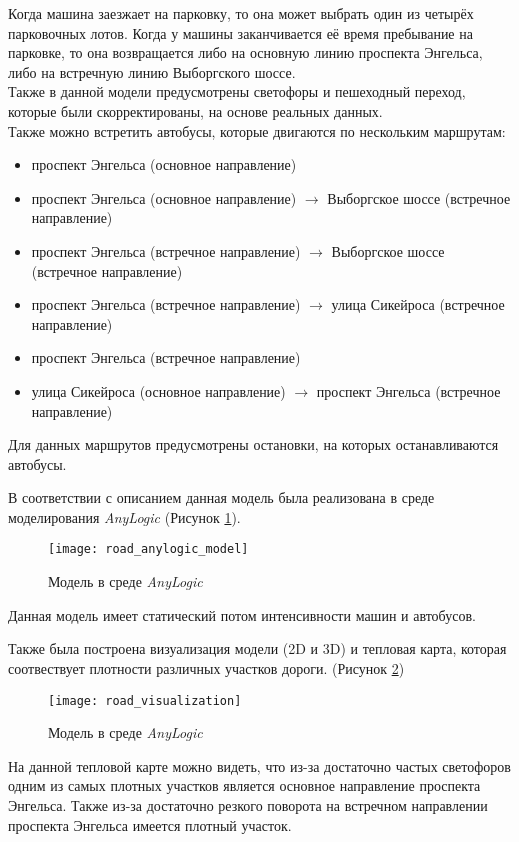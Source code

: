 Когда машина заезжает на парковку, то она может выбрать один из четырёх парковочных лотов. Когда у машины заканчивается её время пребывание на парковке, то она возвращается либо на основную линию проспекта Энгельса, либо на встречную линию Выборгского шоссе.\\

Также в данной модели предусмотрены светофоры и пешеходный переход, которые были скорректированы, на основе реальных данных.\\

Также можно встретить автобусы, которые двигаются по нескольким маршрутам:
\begin{itemize}[topsep=0pt,itemsep=-1ex,partopsep=1ex,parsep=1ex]
	\item проспект Энгельса (основное направление)
	\item проспект Энгельса (основное направление) $\rightarrow$ Выборгское шоссе (встречное направление)
	\item проспект Энгельса (встречное направление) $\rightarrow$ Выборгское шоссе (встречное направление)
	\item проспект Энгельса (встречное направление) $\rightarrow$ улица Сикейроса (встречное направление)
	\item проспект Энгельса (встречное направление)
	\item улица Сикейроса (основное направление) $\rightarrow$ проспект Энгельса (встречное направление)
\end{itemize}

Для данных маршрутов предусмотрены остановки, на которых останавливаются автобусы.

\newpage

В соответствии с описанием данная модель была реализована в среде моделирования \textit{AnyLogic} (Рисунок \ref{fig:road_anylogic_model}).

\begin{figure}[h]
	\centering \texttt{[image: road\_anylogic\_model]}
	\caption{Модель в среде \textit{AnyLogic}}
	\label{fig:road_anylogic_model}
\end{figure}

Данная модель имеет статический потом интенсивности машин и автобусов.\\

\newpage

Также была построена визуализация модели (2D и 3D) и тепловая карта, которая соотвествует плотности различных участков дороги. (Рисунок \ref{fig:road_visualization})

\begin{figure}[h]
	\centering \texttt{[image: road\_visualization]}
	\caption{Модель в среде \textit{AnyLogic}}
	\label{fig:road_visualization}
\end{figure}

На данной тепловой карте можно видеть, что из-за достаточно частых светофоров одним из самых плотных участков является основное направление проспекта Энгельса. Также из-за достаточно резкого поворота на встречном направлении проспекта Энгельса имеется плотный участок.